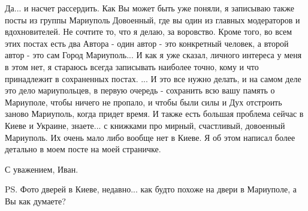 Да... и насчет рассердить. Как Вы может быть уже поняли, я записываю также
посты из группы Мариуполь Довоенный, где вы один из главных модераторов и
вдохновителей. Не сочтите то, что я делаю, за воровство. Кроме того, во всем
этих постах есть два Автора - один автор - это конкретный человек, а второй
автор - это сам Город Мариуполь... И как я уже сказал, личного интереса у меня
в этом нет, я стараюсь всегда записывать наиболее точно, кому и что принадлежит
в сохраненных постах.  ... И это все нужно делать, и на самом деле это дело
мариупольцев, в первую очередь - сохранить всю вашу память о Мариуполе,  чтобы
ничего не пропало, и чтобы были силы и Дух отстроить заново Мариуполь, когда
придет время.  И также есть большая проблема сейчас в Киеве и Украине,
знаете... с книжками про мирный, счастливый, довоенный Мариуполь. Их очень мало
либо вообще нет в Киеве.  Я об этом написал более детально в моем посте на моей
страничке. 

С уважением, Иван.

PS. Фото дверей в Киеве, недавно... как будто похоже на двери в Мариуполе,
а Вы как думаете?
